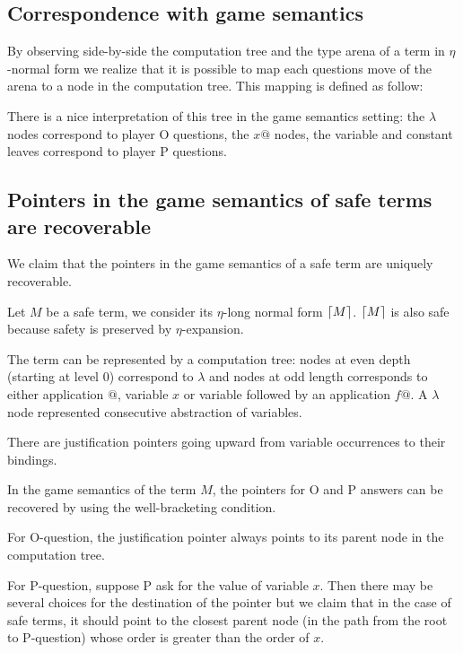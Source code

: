\subsection{Correspondence with game semantics}

By observing side-by-side the computation tree and the type arena of a term in $\eta$-normal form we
realize that it is possible to map each questions move of the arena to a node in the computation tree.
This mapping is defined as follow:



There is a nice interpretation of this tree in the game semantics setting: the $\lambda$ nodes
correspond to player O questions, the $x @$ nodes, the variable and constant leaves
correspond to player P questions.


\subsection{Pointers in the game semantics of safe terms are recoverable}

We claim that the pointers in the game semantics of a safe term are
uniquely recoverable.

Let $M$ be a safe term, we consider its $\eta$-long normal form $\lceil M\rceil$.
$\lceil M\rceil$ is also safe because safety is preserved by $\eta$-expansion.


The term can be represented by a computation tree: nodes at even
depth (starting at level 0) correspond to $\lambda$ and nodes at odd
length corresponds to either application $@$, variable $x$ or
variable followed by an application $f@$. A $\lambda$ node
represented consecutive abstraction of variables.

There are justification pointers going upward from variable
occurrences to their bindings.

In the game semantics of the term $M$, the pointers for O and P
answers can be recovered by using the well-bracketing condition.

For O-question, the justification pointer always points to its
parent node in the computation tree.

For P-question, suppose P ask for the value of variable $x$. Then
there may be several choices for the destination of the pointer but
we claim that in the case of safe terms, it should point to the
closest parent node (in the path from the root to P-question) whose
order is greater than the order of $x$.
